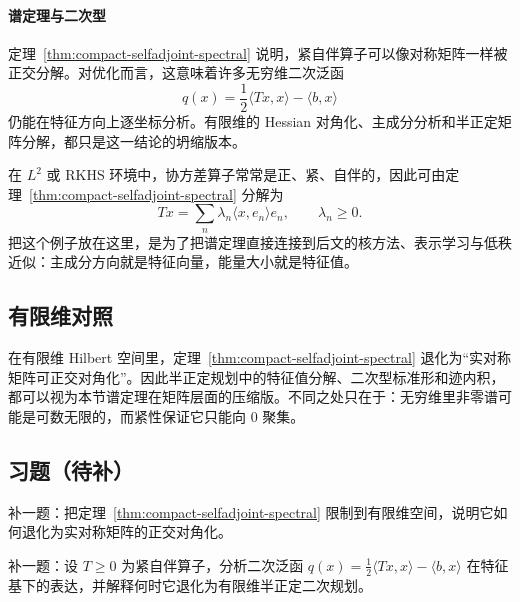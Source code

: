 \paragraph{谱定理与二次型}

\begin{remark}
定理~\ref{thm:compact-selfadjoint-spectral} 说明，紧自伴算子可以像对称矩阵一样被正交分解。对优化而言，这意味着许多无穷维二次泛函
\[
q(x)=\frac12\langle Tx,x\rangle-\langle b,x\rangle
\]
仍能在特征方向上逐坐标分析。有限维的 Hessian 对角化、主成分分析和半正定矩阵分解，都只是这一结论的坍缩版本。
\end{remark}

\begin{example}[协方差算子的谱分解]\label{ex:covariance-operator}
在 $L^2$ 或 RKHS 环境中，协方差算子常常是正、紧、自伴的，因此可由定理~\ref{thm:compact-selfadjoint-spectral} 分解为
\[
Tx=\sum_n \lambda_n \langle x,e_n\rangle e_n,\qquad \lambda_n\ge 0.
\]
把这个例子放在这里，是为了把谱定理直接连接到后文的核方法、表示学习与低秩近似：主成分方向就是特征向量，能量大小就是特征值。
\end{example}

\subsection*{有限维对照}

在有限维 Hilbert 空间里，定理~\ref{thm:compact-selfadjoint-spectral} 退化为“实对称矩阵可正交对角化”。因此半正定规划中的特征值分解、二次型标准形和迹内积，都可以视为本节谱定理在矩阵层面的压缩版。不同之处只在于：无穷维里非零谱可能是可数无限的，而紧性保证它只能向 $0$ 聚集。

\subsection*{习题（待补）}

\begin{exercise}[紧自伴谱定理的矩阵版占位]\label{exr:spectral-matrix-placeholder}
补一题：把定理~\ref{thm:compact-selfadjoint-spectral} 限制到有限维空间，说明它如何退化为实对称矩阵的正交对角化。
\end{exercise}

\begin{exercise}[二次型桥接题占位]\label{exr:quadratic-form-placeholder}
补一题：设 $T\ge 0$ 为紧自伴算子，分析二次泛函 $q(x)=\frac12\langle Tx,x\rangle-\langle b,x\rangle$ 在特征基下的表达，并解释何时它退化为有限维半正定二次规划。
\end{exercise}
